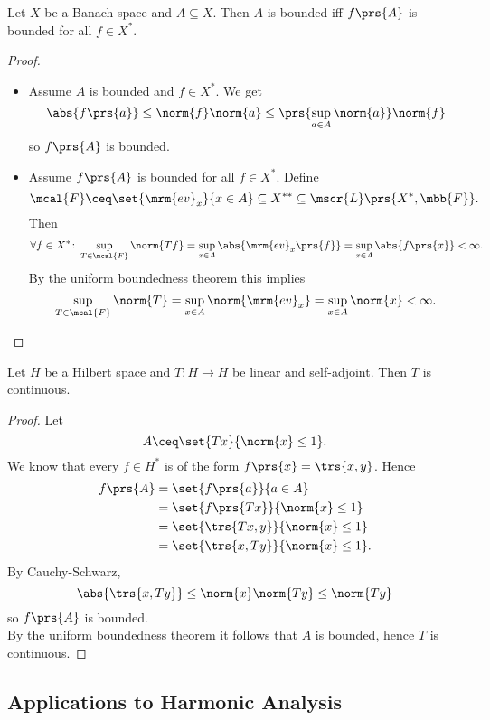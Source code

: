 \documentclass[10pt, twoside]{book}
\begin{document}
\begin{corollary}
Let $X$ be a Banach space and $A \subseteq X$. Then $A$ is bounded iff $f\prs{A}$ is bounded for all $f \in X^*$.
\end{corollary}

\begin{proof}
\begin{itemize}
\item Assume $A$ is bounded and $f \in X^*$. We get
\[\abs{f\prs{a}} \leq \norm{f} \norm{a} \leq \prs{\sup_{a \in A} \norm{a}}\norm{f}\]
so $f\prs{A}$ is bounded.

\item Assume $f\prs{A}$ is bounded for all $f \in X^*$. Define
\[\mcal{F} \ceq \set{\mrm{ev}_x}{x \in A} \subseteq X^{**} \subseteq \mscr{L}\prs{X^*, \mbb{F}} \text{.}\]
Then
\begin{align*}
\forall f \in X^* \colon \sup_{T \in \mcal{F}} \norm{Tf} = \sup_{x \in A} \abs{\mrm{ev}_x\prs{f}} = \sup_{x \in A} \abs{f\prs{x}} < \infty \text{.}
\end{align*}
By the uniform boundedness theorem this implies
\[\sup_{T \in \mcal{F}} \norm{T} = \sup_{x \in A} \norm{\mrm{ev}_x} = \sup_{x \in A} \norm{x} < \infty \text{.}\]
\end{itemize}
\end{proof}

\begin{proposition}
Let $H$ be a Hilbert space and $T \colon H \to H$ be linear and self-adjoint. Then $T$ is continuous.
\end{proposition}

\begin{proof}
Let
\[A \ceq \set{Tx}{\norm{x} \leq 1} \text{.}\]
We know that every $f \in H^*$ is of the form $f\prs{x} = \trs{x,y}$. Hence
\begin{align*}
f\prs{A} &= \set{f\prs{a}}{a \in A}
\\&= \set{f\prs{Tx}}{\norm{x} \leq 1}
\\&= \set{\trs{Tx, y}}{\norm{x} \leq 1}
\\&= \set{\trs{x, Ty}}{\norm{x} \leq 1} \text{.}
\end{align*}
By Cauchy-Schwarz,
\[\abs{\trs{x,Ty}} \leq \norm{x} \norm{Ty} \leq \norm{Ty}\]
so $f\prs{A}$ is bounded.
\\
By the uniform boundedness theorem it follows that $A$ is bounded, hence $T$ is continuous.
\end{proof}

\subsection{Applications to Harmonic Analysis}
\end{document}
